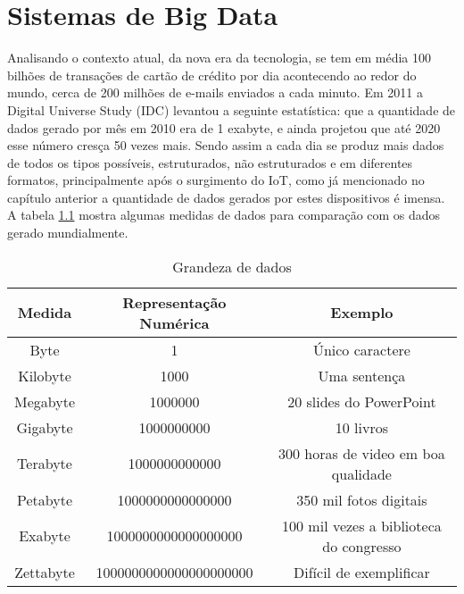 \chapter{Sistemas de Big Data}
\label{chap:bigdata}
Analisando o contexto atual, da nova era da tecnologia, se tem em média 100 bilhões de transações de cartão de crédito por dia acontecendo ao redor do mundo, cerca de 200 milhões de e-mails enviados a cada minuto. Em 2011 a Digital Universe Study (IDC) levantou a seguinte estatística: que a quantidade de dados gerado por mês em 2010 era de 1 exabyte, e ainda projetou que até 2020 esse número cresça 50 vezes mais. Sendo assim a cada dia se produz mais dados de todos os tipos possíveis, estruturados, não estruturados e em diferentes formatos, principalmente após o surgimento do IoT, como já mencionado no capítulo anterior a quantidade de dados gerados por estes dispositivos é imensa. A tabela \ref{tab:medidadados} mostra algumas medidas de dados para comparação com os dados gerado mundialmente.~\cite{sinha2014making}

\begin{table}[h]
\centering
\caption{Grandeza de dados}
\label{tab:medidadados}
\begin{tabular}{|c|c|c|}
\hline 
\rule[-1ex]{0pt}{2.5ex} \textbf{Medida} & \textbf{Representação Numérica} & \textbf{Exemplo} \\ 
\hline 
\rule[-1ex]{0pt}{2.5ex} Byte & 1 & Único caractere \\ 
\hline 
\rule[-1ex]{0pt}{2.5ex} Kilobyte & 1000 & Uma sentença \\ 
\hline 
\rule[-1ex]{0pt}{2.5ex} Megabyte & 1000000 & 20 slides do PowerPoint \\ 
\hline 
\rule[-1ex]{0pt}{2.5ex} Gigabyte & 1000000000 & 10 livros \\ 
\hline 
\rule[-1ex]{0pt}{2.5ex} Terabyte & 1000000000000 & 300 horas de video em boa qualidade \\ 
\hline 
\rule[-1ex]{0pt}{2.5ex} Petabyte & 1000000000000000 & 350 mil fotos digitais \\ 
\hline 
\rule[-1ex]{0pt}{2.5ex} Exabyte & 1000000000000000000 & 100 mil vezes a biblioteca do congresso \\ 
\hline 
\rule[-1ex]{0pt}{2.5ex} Zettabyte & 1000000000000000000000 & Difícil de exemplificar \\ 
\hline 
\end{tabular} 
\end{table}


